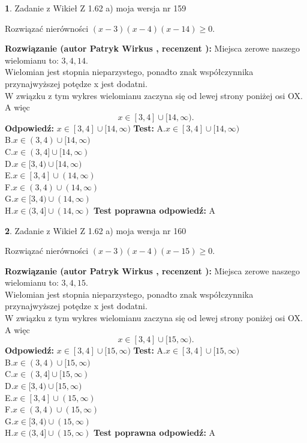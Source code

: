 \documentclass[12pt, a4paper]{article}
\theoremstyle{definition} %
\newtheorem{zad}{}
\newcommand{\zadStart}[1]{\begin{zad}#1\newline}
\newcommand{\zadStop}{\end{zad}}
\newcommand{\rozwStart}[2]{\noindent \textbf{Rozwiązanie (autor #1 , recenzent #2): }\newline}
\newcommand{\rozwStop}{\newline}
\newcommand{\odpStart}{\noindent \textbf{Odpowiedź:}\newline}
\newcommand{\odpStop}{\newline}
\newcommand{\testStart}{\noindent \textbf{Test:}\newline}
\newcommand{\testStop}{\newline}
\newcommand{\kluczStart}{\noindent \textbf{Test poprawna odpowiedź:}\newline}
\newcommand{\kluczStop}{\newline}
\begin{document}
\zadStart{Zadanie z Wikieł Z 1.62 a) moja wersja nr 159}

Rozwiązać nierówności $(x-3)(x-4)(x-14)\ge0$.
\zadStop
\rozwStart{Patryk Wirkus}{}
Miejsca zerowe naszego wielomianu to: $3, 4, 14$.\\
Wielomian jest stopnia nieparzystego, ponadto znak współczynnika przy\linebreak najwyższej potędze x jest dodatni.\\ W związku z tym wykres wielomianu zaczyna się od lewej strony poniżej osi OX. A więc $$x \in [3,4] \cup [14,\infty).$$
\rozwStop
\odpStart
$x \in [3,4] \cup [14,\infty)$
\odpStop
\testStart
A.$x \in [3,4] \cup [14,\infty)$\\
B.$x \in (3,4) \cup [14,\infty)$\\
C.$x \in (3,4] \cup [14,\infty)$\\
D.$x \in [3,4) \cup [14,\infty)$\\
E.$x \in [3,4] \cup (14,\infty)$\\
F.$x \in (3,4) \cup (14,\infty)$\\
G.$x \in [3,4) \cup (14,\infty)$\\
H.$x \in (3,4] \cup (14,\infty)$
\testStop
\kluczStart
A
\kluczStop



\zadStart{Zadanie z Wikieł Z 1.62 a) moja wersja nr 160}

Rozwiązać nierówności $(x-3)(x-4)(x-15)\ge0$.
\zadStop
\rozwStart{Patryk Wirkus}{}
Miejsca zerowe naszego wielomianu to: $3, 4, 15$.\\
Wielomian jest stopnia nieparzystego, ponadto znak współczynnika przy\linebreak najwyższej potędze x jest dodatni.\\ W związku z tym wykres wielomianu zaczyna się od lewej strony poniżej osi OX. A więc $$x \in [3,4] \cup [15,\infty).$$
\rozwStop
\odpStart
$x \in [3,4] \cup [15,\infty)$
\odpStop
\testStart
A.$x \in [3,4] \cup [15,\infty)$\\
B.$x \in (3,4) \cup [15,\infty)$\\
C.$x \in (3,4] \cup [15,\infty)$\\
D.$x \in [3,4) \cup [15,\infty)$\\
E.$x \in [3,4] \cup (15,\infty)$\\
F.$x \in (3,4) \cup (15,\infty)$\\
G.$x \in [3,4) \cup (15,\infty)$\\
H.$x \in (3,4] \cup (15,\infty)$
\testStop
\kluczStart
A
\kluczStop
\end{document}
